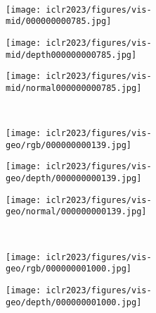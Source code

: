 \documentclass{article} \usepackage{iclr2023_conference,times}
\begin{document}
\begin{figure}
     \\
     \begin{subfigure}[b]{0.32\textwidth}
         \centering
         \texttt{[image: iclr2023/figures/vis-mid/000000000785.jpg]}
         \label{fig:y equals x}
     \end{subfigure}
     \hfill
     \begin{subfigure}[b]{0.32\textwidth}
         \centering
         \texttt{[image: iclr2023/figures/vis-mid/depth000000000785.jpg]}
         \label{fig:three sin x}
     \end{subfigure}
     \hfill
     \begin{subfigure}[b]{0.32\textwidth}
         \centering
         \texttt{[image: iclr2023/figures/vis-mid/normal000000000785.jpg]}
         \label{fig:five over x}
     \end{subfigure}
     \\
     \begin{subfigure}[b]{0.32\textwidth}
         \centering
         \texttt{[image: iclr2023/figures/vis-geo/rgb/000000000139.jpg]}
         \label{fig:y equals x}
     \end{subfigure}
     \hfill
     \begin{subfigure}[b]{0.32\textwidth}
         \centering
         \texttt{[image: iclr2023/figures/vis-geo/depth/000000000139.jpg]}
         \label{fig:three sin x}
     \end{subfigure}
     \hfill
     \begin{subfigure}[b]{0.32\textwidth}
         \centering
         \texttt{[image: iclr2023/figures/vis-geo/normal/000000000139.jpg]}
         \label{fig:five over x}
     \end{subfigure}
     \\
     \begin{subfigure}[b]{0.32\textwidth}
         \centering
         \texttt{[image: iclr2023/figures/vis-geo/rgb/000000001000.jpg]}
         \label{fig:y equals x}
     \end{subfigure}
     \hfill
     \begin{subfigure}[b]{0.32\textwidth}
         \centering
         \texttt{[image: iclr2023/figures/vis-geo/depth/000000001000.jpg]}
         \label{fig:three sin x}
     \end{subfigure}
     \hfill
     \begin{subfigure}[b]{0.32\textwidth}
         \centering

\end{subfigure}
\end{figure}
\end{document}
